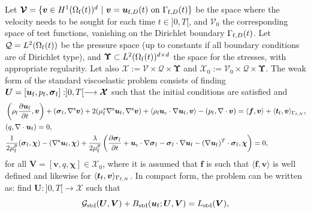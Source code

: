 \documentclass[11pt,english]{article}
\def\ufluid{\boldsymbol{u}_{\rm{f}}}
\def\sigmafluid{\boldsymbol{\sigma}_{\rm{f}}}
\def\pfluid{p_{\rm{f}}}
\def\viscs{\mu^{s}_{\rm{f}}}
\def\viscp{\mu^{p}_{\rm{f}}}
\def\alevelocity{\boldsymbol{u}_{\mathrm{c}}}
\begin{document}
Let $\boldsymbol{\mathcal{V}} = \{ \boldsymbol{v}\in H^1(\Omega_{\rm f}(t))^d ~\vert~  \boldsymbol{v} =  \boldsymbol{u}_{{\rm f},D} (t)~\hbox{on}~\Gamma_{{\rm f},D}(t) \}$ be  the space where the velocity needs to be  sought for each time $t\in ]0,T[$, and $\boldsymbol{\mathcal{V}}_0$ the corresponding space of test functions, vanishing on the Dirichlet boundary $ \Gamma_{{\rm{f}},D}(t)$. Let $\mathcal{Q} = L^2(\Omega_{\rm f}(t))$ be the pressure space (up to constants if all boundary conditions are of Dirichlet type), and $\boldsymbol{\Upsilon}\subset L^2(\Omega_{\rm f}(t))^{d\times d }$ the space for the stresses, with appropriate regularity.  Let also $\boldsymbol{\mathcal{X}} := \boldsymbol{\mathcal{V}} \times \mathcal{Q} \times \boldsymbol{\Upsilon}$ and $\boldsymbol{\mathcal{X}}_0 := \boldsymbol{\mathcal{V}}_0 \times \mathcal{Q} \times \boldsymbol{\Upsilon}$. The weak form of the standard viscoelastic problem consists of finding $\boldsymbol{U}=[\ufluid,\pfluid,\sigmafluid]:]0,T[\longrightarrow\boldsymbol{\mathcal{X}}$ such that the initial conditions are satisfied and 
\begin{align*}
&    \left(\rho_{\rm{f}}\dfrac{\partial\ufluid}{\partial t},\boldsymbol{v}\right)+(\sigmafluid,\nabla^{\rm s}\boldsymbol{v})+2(\viscs\nabla^{\rm s}\ufluid,\nabla^{\rm s}\boldsymbol{v})+\langle\rho_{\rm{f}}\alevelocity\cdot\nabla\ufluid,\boldsymbol{v}\rangle-(\pfluid,\nabla\cdot\boldsymbol{v}) =\langle\boldsymbol{f},\boldsymbol{v}\rangle + \langle\boldsymbol{t}_{\rm f},\boldsymbol{v}\rangle_{\Gamma_{{\rm f} , N}},\\
&    (q,\nabla\cdot\ufluid)  =0,\\
&    \dfrac{1}{2\viscp}(\sigmafluid,\boldsymbol{\chi})-(\nabla^{\rm s}\ufluid,\boldsymbol{\chi})+\dfrac{\lambda}{2\viscp}\left(\dfrac{\partial\sigmafluid}{\partial t}+\alevelocity\cdot\nabla\sigmafluid-\sigmafluid\cdot\nabla\ufluid-(\nabla\ufluid)^{T}\cdot\sigmafluid,\boldsymbol{\chi} \right)  =0,
\end{align*}
for all $\boldsymbol{V}=[\boldsymbol{v},q,\boldsymbol{\chi}]\in\boldsymbol{\mathcal{X}}_0$,
where it is assumed that $\boldsymbol{f}$ is such that $\langle\boldsymbol{f},\boldsymbol{v}\rangle$
is well defined and likewise for $ \langle\boldsymbol{t}_{\rm f},\boldsymbol{v}\rangle_{\Gamma_{{\rm f} , N}}$. In compact form, the problem can be written as: find $\boldsymbol{U} :]0,T[\longrightarrow\boldsymbol{\mathcal{X}}$ such that 
\begin{equation}
\mathcal{G}_{\text{std}}(\boldsymbol{U},\boldsymbol{V})+B_{\text{std}}(\ufluid;\boldsymbol{U},\boldsymbol{V})=L_{\text{std}}(\boldsymbol{V}),\label{eq:VarCompact}
\end{equation}
\end{document}
